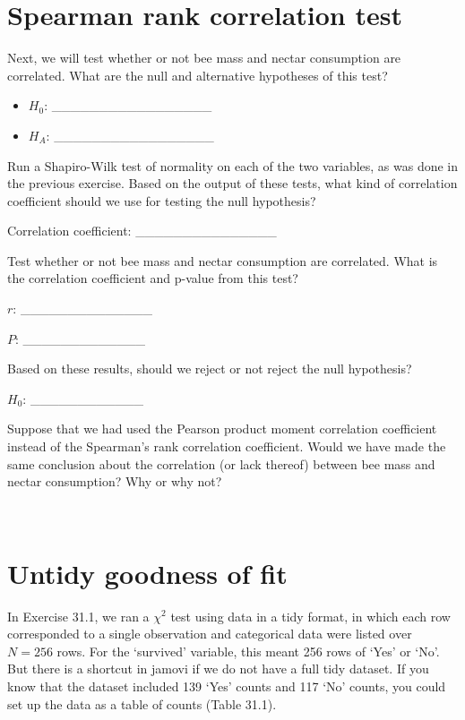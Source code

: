 \documentclass[
  openany]{krantz}
\begin{document}
\hypertarget{spearman-rank-correlation-test}{%
\section{Spearman rank correlation test}\label{spearman-rank-correlation-test}}

Next, we will test whether or not bee mass and nectar consumption are correlated.
What are the null and alternative hypotheses of this test?

\begin{itemize}
\item
  \(H_{0}\): \_\_\_\_\_\_\_\_\_\_\_\_\_\_\_\_\_
\item
  \(H_{A}\): \_\_\_\_\_\_\_\_\_\_\_\_\_\_\_\_\_
\end{itemize}

Run a Shapiro-Wilk test of normality on each of the two variables, as was done in the previous exercise.
Based on the output of these tests, what kind of correlation coefficient should we use for testing the null hypothesis?

Correlation coefficient: \_\_\_\_\_\_\_\_\_\_\_\_\_\_\_

Test whether or not bee mass and nectar consumption are correlated.
What is the correlation coefficient and p-value from this test?

\(r\): \_\_\_\_\_\_\_\_\_\_\_\_\_\_

\(P\): \_\_\_\_\_\_\_\_\_\_\_\_\_

Based on these results, should we reject or not reject the null hypothesis?

\(H_{0}\): \_\_\_\_\_\_\_\_\_\_\_\_

Suppose that we had used the Pearson product moment correlation coefficient instead of the Spearman's rank correlation coefficient.
Would we have made the same conclusion about the correlation (or lack thereof) between bee mass and nectar consumption?
Why or why not?

\begin{verbatim}


\end{verbatim}

\hypertarget{untidy-goodness-of-fit}{%
\section{Untidy goodness of fit}\label{untidy-goodness-of-fit}}

In Exercise 31.1, we ran a \(\chi^{2}\) test using data in a tidy format, in which each row corresponded to a single observation and categorical data were listed over \(N = 256\) rows.
For the `survived' variable, this meant 256 rows of `Yes' or `No'.
But there is a shortcut in jamovi if we do not have a full tidy dataset.
If you know that the dataset included 139 `Yes' counts and 117 `No' counts, you could set up the data as a table of counts (Table 31.1).
\end{document}
